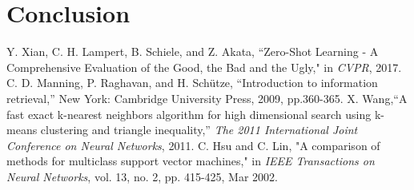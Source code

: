 \documentclass[conference]{IEEEtran}
\begin{document}
\section{Conclusion}

\begin{thebibliography}{00}
  Y. Xian, C. H. Lampert, B. Schiele, and Z. Akata, ``Zero-Shot Learning - A Comprehensive Evaluation of the Good, the Bad and the Ugly," in \emph{CVPR}, 2017.
 C. D. Manning, P. Raghavan, and H. Schütze, ``Introduction to information retrieval,'' New York: Cambridge University Press, 2009, pp.360-365.
 X. Wang,``A fast exact k-nearest neighbors algorithm for high dimensional search using k-means clustering and triangle inequality,'' \emph{The 2011 International Joint Conference on Neural Networks}, 2011.
 C. Hsu and C. Lin, "A comparison of methods for multiclass support vector machines," in \emph{IEEE Transactions on Neural Networks}, vol. 13, no. 2, pp. 415-425, Mar 2002.
\end{thebibliography}
\end{document}
